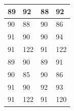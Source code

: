 \begin{table}[H]
	\centering
	\begin{small}
		\begin{tabular}{|p{2cm}|p{2cm}|p{2cm}|p{2cm}|}
			\hline
			89 & 92 & 88 & 92 \\
			\hline
			90 & 88 & 90 & 86 \\
			\hline
			91 & 90 & 90 & 94 \\
			\hline
			91 & 122 & 91 & 122 \\
			\hline
			89 & 90 & 89 & 91 \\
			\hline
			90 & 85 & 90 & 86 \\
			\hline
			91 & 90 & 92 & 93 \\
			\hline
			91 & 122 & 91 & 120 \\
			\hline
		\end{tabular}
	\end{small}
	\label{fig:MatriksCitraHasilPreprocessing}
\end{table}

